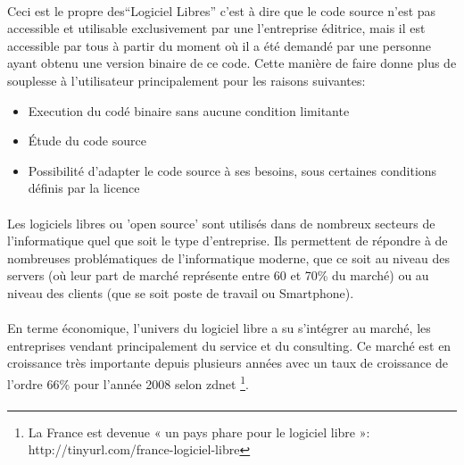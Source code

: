 \paragraph{} Ceci est le propre des``Logiciel Libres'' c'est à dire
que le code source n'est pas accessible et utilisable exclusivement par
une l'entreprise éditrice, mais il est accessible par tous à partir du
moment où il a été demandé par une personne ayant obtenu une version
binaire de ce code. Cette manière de faire donne plus de souplesse à
l'utilisateur principalement pour les raisons suivantes:

\begin{itemize}

  \item {Execution du codé binaire sans aucune condition limitante}

  \item {Étude du code source}

  \item {Possibilité d'adapter le code source à ses besoins, sous
  certaines
    conditions définis par la licence}

\end{itemize}

\paragraph {}

Les logiciels libres ou 'open source' sont utilisés dans de nombreux
secteurs de l'informatique quel que soit le type d'entreprise. Ils
permettent de répondre à de nombreuses problématiques de l'informatique
moderne, que ce soit au niveau des servers (où leur part de marché
représente entre 60 et 70\% du marché) ou au niveau des clients (que
se soit poste de travail ou Smartphone).

\paragraph {}

En terme économique, l'univers du logiciel libre a su s'intégrer
au marché, les entreprises vendant principalement du service et du
consulting. Ce marché est en croissance très importante depuis plusieurs
années avec un taux de croissance de l'ordre 66\% pour l'année 2008
selon zdnet \footnote{La France est devenue « un pays phare pour le
logiciel libre »: http://tinyurl.com/france-logiciel-libre}.

\paragraph{}

